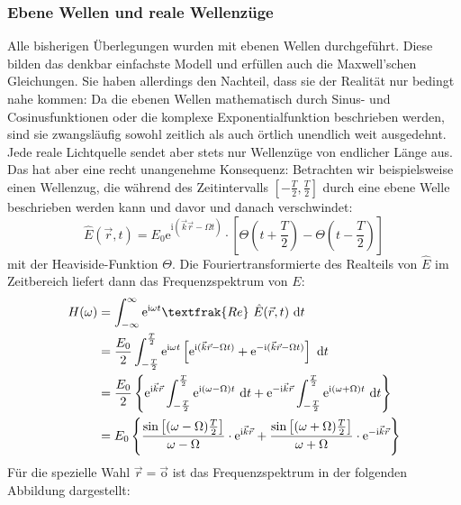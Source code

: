 \documentclass[german,  %
parskip=full,  %
]{scrartcl}
\begin{document}
\subsubsection{Ebene Wellen und reale Wellenzüge}
Alle bisherigen Überlegungen wurden mit ebenen Wellen durchgeführt. Diese bilden das denkbar einfachste Modell und erfüllen auch die Maxwell'schen Gleichungen. Sie haben allerdings den Nachteil, dass sie der Realität nur bedingt nahe kommen: Da die ebenen Wellen mathematisch durch Sinus- und Cosinusfunktionen oder die komplexe Exponentialfunktion beschrieben werden, sind sie zwangsläufig sowohl zeitlich als auch örtlich unendlich weit ausgedehnt. Jede reale Lichtquelle sendet aber stets nur Wellenzüge von endlicher Länge aus. Das hat aber eine recht unangenehme Konsequenz: Betrachten wir beispielsweise einen Wellenzug, die während des Zeitintervalls \(\left[-\frac{T}{2},\frac{T}{2}\right]\) durch eine ebene Welle beschrieben werden kann und davor und danach verschwindet:
\[\hat{E}(\vec{r},t) = E_0 \mathrm{e}^{\mathrm{i}(\vec{k}\vec{r} - \Omega t)} \cdot\left[\Theta\left(t+\frac{T}{2}\right) - \Theta\left(t-\frac{T}{2}\right)\right]\]
mit der Heaviside-Funktion \(\Theta\). Die Fouriertransformierte des Realteils von \(\hat{E}\) im Zeitbereich liefert dann das Frequenzspektrum von \(E\):
\begin{align*}
H(\omega) &= \int_{-\infty}^{\infty} \mathrm{e}^{\mathrm{i}\omega t}\textfrak{Re} \ \hat{E}(\vec{r},t) \ \mathrm{d} t \\
&= \frac{E_0}{2} \int_{-\frac{T}{2}}^{\frac{T}{2}} \mathrm{e}^{\mathrm{i}\omega t}\left[\mathrm{e}^{\mathrm{i}(\vec{k}\vec{r} - \Omega t)} + \mathrm{e}^{-\mathrm{i}(\vec{k}\vec{r} - \Omega t)}\right] \ \mathrm{d} t \\
&= \frac{E_0}{2} \left\lbrace \mathrm{e}^{\mathrm{i}\vec{k}\vec{r}}\int_{-\frac{T}{2}}^{\frac{T}{2}} \mathrm{e}^{\mathrm{i}(\omega - \Omega) t} \ \mathrm{d} t + 
\mathrm{e}^{-\mathrm{i}\vec{k}\vec{r}}\int_{-\frac{T}{2}}^{\frac{T}{2}} \mathrm{e}^{\mathrm{i}(\omega + \Omega) t} \ \mathrm{d} t\right\rbrace \\
&= E_0 \left\lbrace   \frac{\sin\left[(\omega - \Omega)\frac{T}{2}\right]}{\omega - \Omega} \cdot \mathrm{e}^{\mathrm{i}\vec{k}\vec{r}} +  \frac{\sin\left[(\omega + \Omega)\frac{T}{2}\right]}{\omega + \Omega} \cdot \mathrm{e}^{-\mathrm{i}\vec{k}\vec{r}}\right\rbrace
\end{align*}
Für die spezielle Wahl \(\vec{r} = \vec{\mathrm{o}}\) ist das Frequenzspektrum in der folgenden Abbildung dargestellt:
\end{document}
